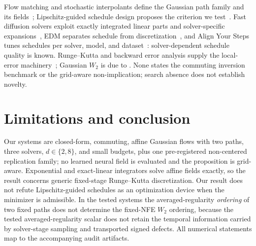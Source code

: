 \documentclass{article}
\newcommand{\wtwo}{W_2}
\begin{document}
Flow matching and stochastic interpolants define the Gaussian path
family and its fields~\citep{lipman2023flow,albergo2025stochastic,
liu2023rectified}; Lipschitz-guided schedule design proposes the
criterion we test~\citep{lipschitzguided2025}. Fast diffusion solvers
exploit exactly integrated linear parts and solver-specific
expansions~\citep{lu2022dpmsolver,lu2022dpmsolverpp,zhang2023deis}, EDM
separates schedule from discretization~\citep{karras2022edm}, and Align
Your Steps tunes schedules per solver, model, and
dataset~\citep{sabour2024align}: solver-dependent schedule quality is
known. Runge--Kutta and backward error analysis supply the local-error
machinery~\citep{butcher1963coefficients,hairer1993solving,
hairer2006geometric}; Gaussian $\wtwo$ is due to
\citet{gelbrich1990formula}. None states the commuting inversion
benchmark or the grid-aware non-implication; search absence does not
establish novelty.

\section{Limitations and conclusion}
\label{sec:limits}

Our systems are closed-form, commuting, affine Gaussian flows with two
paths, three solvers, $d\in\{2,8\}$, and small budgets, plus one
pre-registered non-centered replication family; no learned neural field
is evaluated and the proposition is grid-aware. Exponential and
exact-linear integrators solve affine fields exactly, so the result concerns
generic fixed-stage Runge--Kutta discretization. Our result does not refute Lipschitz-guided schedules as an optimization
device when the minimizer is admissible. In the tested systems the
averaged-regularity \emph{ordering} of two fixed paths does not determine
the fixed-NFE $\wtwo$ ordering, because the tested averaged-regularity
scalar does not retain the temporal information carried by solver-stage
sampling and transported signed defects. All
numerical statements map to the accompanying audit artifacts.



\end{document}
